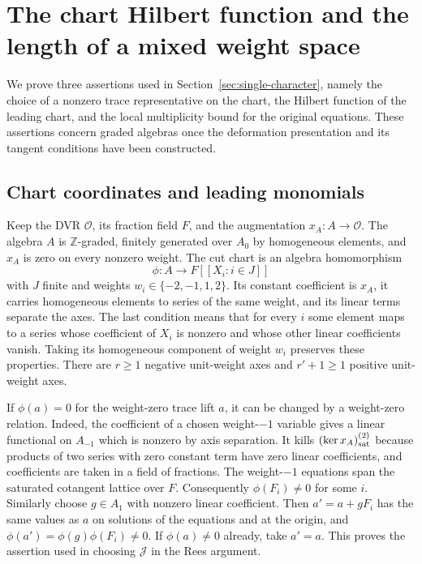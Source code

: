 \section{The chart Hilbert function and the length of a mixed weight space}
\label{sec:deformation-chart}

We prove three assertions used in Section~\ref{sec:single-character}, namely
the choice of a nonzero trace representative on the chart, the
Hilbert function of the leading chart, and the local multiplicity
bound for the original equations. These assertions concern graded
algebras once the deformation presentation and its tangent
conditions have been constructed.

\subsection{Chart coordinates and leading monomials}

Keep the DVR \(\mathcal O\), its fraction field \(F\), and the
augmentation \(x_A:A\to\mathcal O\). The algebra \(A\) is
\(\mathbb Z\)-graded, finitely generated over \(A_0\) by homogeneous
elements, and \(x_A\) is zero on every nonzero weight. The cut chart
is an algebra homomorphism
\[
           \phi:A\longrightarrow F[[X_i:i\in J]]
\]
with \(J\) finite and weights \(w_i\in\{-2,-1,1,2\}\). Its constant
coefficient is \(x_A\), it carries homogeneous elements to series of
the same weight, and its linear terms separate the axes. The last
condition means that for every \(i\) some element maps to a series
whose coefficient of \(X_i\) is nonzero and whose other linear
coefficients vanish. Taking its homogeneous component of weight
\(w_i\) preserves these properties. There are \(r\ge1\) negative
unit-weight axes and \(r'+1\ge1\) positive unit-weight axes.

If \(\phi(a)=0\) for the weight-zero trace lift \(a\), it can be
changed by a weight-zero relation. Indeed, the coefficient of a chosen
weight-\(-1\) variable gives a linear functional on \(A_{-1}\)
which is nonzero by axis separation. It kills
\((\ker x_A)^{(2)}_{\rm sat}\) because products of two series with
zero constant term have zero linear coefficients, and coefficients
are taken in a field of fractions. The weight-\(-1\) equations
span the saturated cotangent lattice over \(F\). Consequently
\(\phi(F_i)\ne0\) for some \(i\). Similarly choose \(g\in A_1\)
with nonzero linear coefficient. Then \(a'=a+gF_i\) has the same
values as \(a\) on solutions of the equations and at the origin,
and \(\phi(a')=\phi(g)\phi(F_i)\ne0\). If \(\phi(a)\ne0\) already,
take \(a'=a\). This proves the assertion used in choosing
\(\mathcal J\) in the Rees argument.

